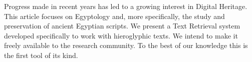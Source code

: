 Progress made in recent years has led to a growing interest in Digital Heritage. This article focuses on Egyptology and, more specifically, the study and preservation of ancient Egyptian scripts. We present a Text Retrieval system developed specifically to work with hieroglyphic texts. We intend to make it freely available to the research community. To the best of our knowledge this is the first tool of its kind.

